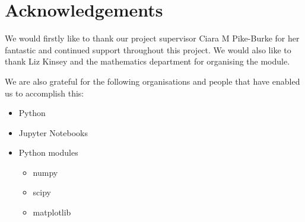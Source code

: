 \section{Acknowledgements}\label{sec:acknowledgements}
We would firstly like to thank our project supervisor Ciara M Pike-Burke for her fantastic and continued support throughout this project.
We would also like to thank Liz Kinsey and the mathematics department for organising the module.

We are also grateful for the following organisations and people that have enabled us to accomplish this:

\begin{itemize}
    \item Python~\citep{10.5555/1593511}
    \item Jupyter Notebooks~\citep{Kluyver2016jupyter}
    \item Python modules
    \begin{itemize}
        \item numpy~\citep{2020NumPy-Array}
        \item scipy~\citep{2020SciPy-NMeth}
        \item matplotlib~\citep{Hunter:2007}
    \end{itemize}
\end{itemize}